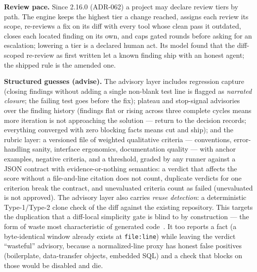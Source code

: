 \documentclass[11pt]{article}
\begin{document}
\textbf{Review pace.} Since 2.16.0 (ADR-062) a project may declare review
tiers by path. The engine keeps the highest tier a change reached, assigns
each review its scope, re-reviews a fix on its diff with every tool whose
clean pass it outdated, closes each located finding on its own, and caps
gated rounds before asking for an escalation; lowering a tier is a declared
human act. Its model found that the diff-scoped re-review as first written
let a known finding ship with an honest agent; the shipped rule is the
amended one.

\textbf{Structured guesses (advise).} The advisory layer includes regression
capture (closing findings without adding a single non-blank test line is
flagged as \emph{narrated closure}; the failing test goes before the fix);
plateau and stop-signal advisories over the finding history (findings flat or
rising across three complete cycles means more iteration is not approaching
the solution --- return to the decision records; everything converged with
zero blocking facts means cut and ship); and the rubric layer: a versioned
file of weighted qualitative criteria --- conventions, error-handling sanity,
interface ergonomics, documentation quality --- with anchor examples, negative
criteria, and a threshold, graded by any runner against a JSON contract with
evidence-or-nothing semantics: a verdict that affects the score without a
file-and-line citation does not count, duplicate verdicts for one criterion
break the contract, and unevaluated criteria count as failed (unevaluated is
not approved). The advisory layer also carries \emph{reuse detection}: a
deterministic Type-1/Type-2 clone check of the diff against the existing
repository. This targets the duplication that a diff-local simplicity gate is
blind to by construction --- the form of waste most characteristic of generated
code~\cite{poppendieck2006lean,gitclear2026gap}. It too reports a fact (a
byte-identical window already exists at \texttt{file:line}) while leaving the
verdict ``wasteful'' advisory, because a normalized-line proxy has honest false
positives (boilerplate, data-transfer objects, embedded SQL) and a check that
blocks on those would be disabled and die.
\end{document}
